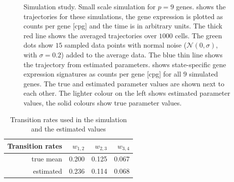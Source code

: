 \begin{figure}
  \centering
  \caption{Simulation study. Small scale simulation for $p=9$ genes.  shows the trajectories for these simulations, the gene expression  is plotted as counts per gene [cpg] and the time is in arbitrary units. The thick red line shows the averaged trajectories over $1000$ cells. The green dots show $15$ sampled data points with normal noise ($\mathcal{N}(0, \sigma)$, with $\sigma=0.2$) added to the average data. The blue thin line shows the trajectory from estimated parameters.  shows state-specific gene expression signatures as counts per gene [cpg] for all $9$ simulated genes. The true and estimated parameter values are shown next to each other. The lighter colour on the left shows estimated parameter values, the solid colours show true parameter values.}
  \label{fig:small-scale-sim}
\end{figure}

\begin{table}[h]
    \centering
\begin{tabular}{r|rrr}
  \hline \hline
  \bf{Transition rates}& $w_{1,2}$ & $w_{2,3}$ & $w_{3,4}$ \\
  \hline
  true mean & 0.200 & 0.125 & 0.067 \\
  estimated & 0.236 & 0.114 & 0.068 \\
   \hline
 \end{tabular}
 \caption{Transition rates used in the simulation and the estimated values}
 \label{tab:fit-w}
\end{table}

